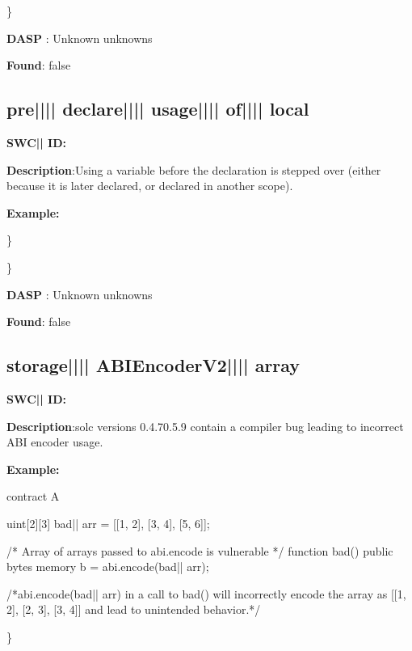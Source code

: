 \documentclass{article}
\begin{document}
\} 

\textbf{DASP} : Unknown unknowns

\textbf{Found}: false

\subsection{pre{||\textunderscore|| }declare{||\textunderscore|| }usage{||\textunderscore|| }of{||\textunderscore|| }local} 
\textbf{SWC{|\textunderscore| }ID:} 

\textbf{Description}:Using a variable before the declaration is stepped over (either because it is later declared, or declared in another scope).


\textbf{Example:} 
\} 

\} 

\textbf{DASP} : Unknown unknowns

\textbf{Found}: false

\subsection{storage{||\textunderscore|| }ABIEncoderV2{||\textunderscore|| }array} 
\textbf{SWC{|\textunderscore| }ID:} 

\textbf{Description}:solc versions 0.4.7{\textendash}0.5.9 contain a compiler bug leading to incorrect ABI encoder usage.


\textbf{Example:} 
\begin{ffcode} 

contract A {
    uint[2][3] bad|\textunderscore| arr = [[1, 2], [3, 4], [5, 6]];

    /* Array of arrays passed to abi.encode is vulnerable */
    function bad() public {
        bytes memory b = abi.encode(bad|\textunderscore| arr);
    }
}

 /*abi.encode(bad|\textunderscore| arr) in a call to bad() will incorrectly encode the array as [[1, 2], [2, 3], [3, 4]] and lead to unintended behavior.*/ 

\end{ffcode} 
\} 
\end{document}
